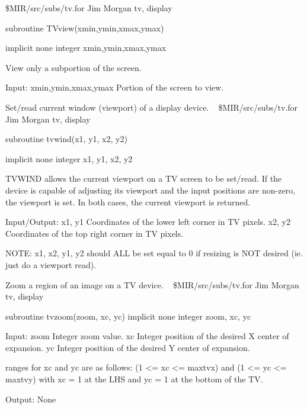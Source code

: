 \newline {} \$MIR/src/subs/tv.for
\newline {} Jim Morgan
\newline {} tv, display
\par{\tenpoint
{\eightpoint\begintt
        subroutine TVview(xmin,ymin,xmax,ymax)

        implicit none
        integer xmin,ymin,xmax,ymax

  View only a subportion of the screen.

  Input:
    xmin,ymin,xmax,ymax Portion of the screen to view.
\endtt}
\par}
%
\noindent Set/read current window (viewport) of a display device.
\newline \ 
\newline {} \$MIR/src/subs/tv.for
\newline {} Jim Morgan
\newline {} tv, display
\par{\tenpoint
{\eightpoint\begintt
      subroutine tvwind(x1, y1, x2, y2)

      implicit none
      integer x1, y1, x2, y2

  TVWIND allows the current viewport on a TV screen to be set/read.
  If the device is capable of adjusting its viewport and the input
  positions are non-zero, the viewport is set.  In both cases, the
  current viewport is returned.

  Input/Output:
    x1, y1   Coordinates of the lower left corner in TV pixels.
    x2, y2   Coordinates of the top right corner in TV pixels.

  NOTE:  x1, x2, y1, y2 should ALL be set equal to 0 if resizing is NOT
         desired (ie. just do a viewport read).
\endtt}
\par}
%
\noindent Zoom a region of an image on a TV device.
\newline \ 
\newline {} \$MIR/src/subs/tv.for
\newline {} Jim Morgan
\newline \abox{Keywords:} tv, display
\par{\tenpoint
{\eightpoint\begintt
       subroutine tvzoom(zoom, xc, yc)
       implicit none
       integer zoom, xc, yc

  Input:
    zoom    Integer zoom value.
    xc      Integer position of the desired X center of expansion.
    yc      Integer position of the desired Y center of expansion.

            ranges for xc and yc are as follows:
              (1 <= xc <= maxtvx) and (1 <= yc <= maxtvy) with
              xc = 1 at the LHS and yc = 1 at the bottom of the TV.

  Output:
    None
\endtt}
\par}
